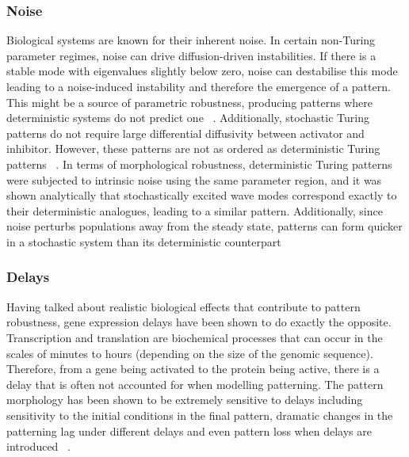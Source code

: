 \subsubsection{Noise}
Biological systems are known for their inherent noise.
In certain non-Turing parameter regimes, noise can drive diffusion-driven instabilities.
If there is a stable mode with eigenvalues slightly below zero, noise can destabilise this mode leading to a noise-induced instability and therefore the emergence of a pattern.
This might be a source of parametric robustness, producing patterns where deterministic systems do not predict one ~\parencite{Butler2009, Butler2011, Biancalani2010}.
Additionally, stochastic Turing patterns do not require large differential diffusivity between activator and inhibitor.
However, these patterns are not as ordered as deterministic Turing patterns ~\parencite{Karig2018}.
In terms of morphological robustness, deterministic Turing patterns were subjected to intrinsic noise using the same parameter region, and it was shown analytically that stochastically excited wave modes correspond exactly to their deterministic analogues, leading to a similar pattern.
Additionally, since noise perturbs populations away from the steady state, patterns can form quicker in a stochastic system than its deterministic counterpart ~\parencite{Maini2012}


\subsubsection{Delays} Having talked about realistic biological effects that contribute to pattern robustness, gene expression delays have been shown to do exactly the opposite.
Transcription and translation are biochemical processes that can occur in the scales of minutes to hours (depending on the size of the genomic sequence).
Therefore, from a gene being activated to the protein being active, there is a delay that is often not accounted for when modelling patterning.
The pattern morphology has been shown to be extremely sensitive to delays including sensitivity to the initial conditions in the final pattern, dramatic changes in the patterning lag under different delays and even pattern loss when delays are introduced ~\parencite{Maini2012}.



